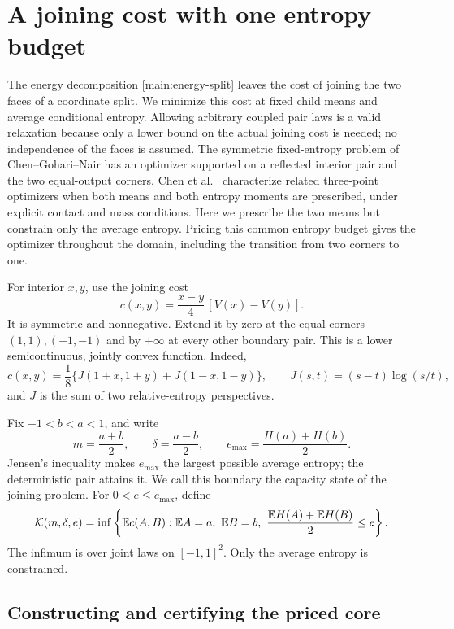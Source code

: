\section{A joining cost with one entropy budget}
\label{canonical:section}

The energy decomposition \eqref{main:energy-split} leaves the cost of
joining the two faces of a coordinate split. We minimize this cost at
fixed child means and average conditional entropy. Allowing arbitrary
coupled pair laws is a valid relaxation because only a lower bound on
the actual joining cost is needed; no independence of the faces is assumed.
The symmetric fixed-entropy problem of
Chen--Gohari--Nair \cite[Theorem~4 and Section~IV-C]{ChenGohariNair2025}
has an optimizer supported on a reflected interior pair and the two
equal-output corners. Chen et al.\ \cite[Section~3.1, Theorem~3.10]{ChenEtAl2026CK}
characterize related three-point optimizers when both means and both
entropy moments are prescribed, under explicit contact and mass conditions.
Here we prescribe the two means but constrain only the average entropy.
Pricing this common entropy budget gives the optimizer throughout the
domain, including the transition from two corners to one.

For interior $x,y$, use the joining cost
\begin{equation}
 c(x,y)=\frac{x-y}{4}\,[V(x)-V(y)].
 \label{canonical:cost}
\end{equation}
It is symmetric and nonnegative.  Extend it by zero at the equal
corners $(1,1),(-1,-1)$ and by $+\infty$ at every other boundary pair.
This is a lower semicontinuous, jointly convex function.  Indeed,
\[
 c(x,y)=\frac18\{J(1+x,1+y)+J(1-x,1-y)\},
 \qquad J(s,t)=(s-t)\log(s/t),
\]
and $J$ is the sum of two relative-entropy perspectives.

Fix $-1<b<a<1$, and write
\[
 m=\frac{a+b}{2},\qquad \delta=\frac{a-b}{2},\qquad
 e_{\max}=\frac{H(a)+H(b)}2.
\]
Jensen's inequality makes $e_{\max}$ the largest possible average
entropy; the deterministic pair attains it.  We call this boundary
the capacity state of the joining problem.
For $0<e\le e_{\max}$, define
\begin{equation}
 \mathcal K(m,\delta,e)=
 \inf\left\{\mathbb E c(A,B):
 \mathbb E A=a,\ \mathbb E B=b,\
 \frac{\mathbb E H(A)+\mathbb E H(B)}2\le e\right\}.
 \label{canonical:budget}
\end{equation}
The infimum is over joint laws on $[-1,1]^2$.  Only the average entropy
is constrained.

\subsection{Constructing and certifying the priced core}

